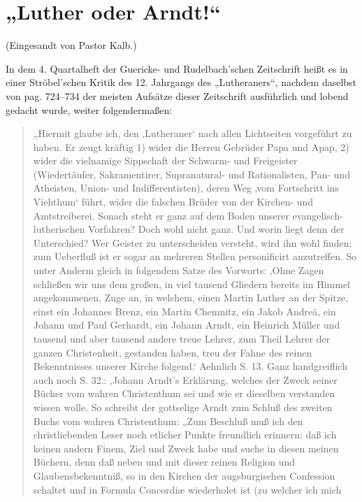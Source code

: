 \chapter{„Luther oder Arndt!“}

\begin{center}
(Eingesandt von Pastor Kalb.)
\end{center}

In dem 4. Quartalheft der Guericke- und Rudelbach’schen Zeitschrift heißt es in einer Ströbel’schen
Kritik des 12. Jahrgangs des „Lutheraners“, nachdem daselbst von pag. 724–734 der meisten Aufsätze
dieser Zeitschrift ausführlich und lobend gedacht wurde, weiter folgendermaßen:

\begin{quote}
„Hiermit glaube ich, den ‚Lutheraner‘ nach allen Lichtseiten vorgeführt zu haben. Er zeugt
kräftig 1) wider die Herren Gebrüder Papa und Apap, 2) wider die vielnamige Sippschaft der Schwarm- und
Freigeister (Wiedertäufer, Sakramentirer, Supranatural- und Rationalisten, Pan- und Atheisten, Union-
und Indifferentisten), deren Weg ‚vom Fortschritt ins Viehthum‘ führt, wider die falschen Brüder
von der Kirchen- und Amtstreiberei. Sonach steht er ganz auf dem Boden unserer evangelisch-lutherischen
Vorfahren? Doch wohl nicht ganz. Und worin liegt denn der Unterschied? Wer Geister zu unterscheiden versteht,
wird ihn wohl finden; zum Ueberfluß ist er sogar an mehreren Stellen personificirt anzutreffen. So
unter Anderm gleich in folgendem Satze des Vorworts: ‚Ohne Zagen schließen wir uns dem großen,
in viel tausend Gliedern bereits im Himmel angekommenen, Zuge an, in welchem, einen Martin Luther
an der Spitze, einst ein Johannes Brenz, ein Martin Chemnitz, ein Jakob Andreä, ein Johann und Paul
Gerhardt, ein Johann Arndt, ein Heinrich Müller und tausend und aber tausend andere treue Lehrer, zum
Theil Lehrer der ganzen Christenheit, gestanden haben, treu der Fahne des reinen Bekenntnisses unserer
Kirche folgend.‘ Aehnlich S. 13. Ganz handgreiflich auch noch S. 32.: ‚Johann Arndt’s Erklärung,
welches der Zweck seiner Bücher vom wahren Christenthum sei und wie er dieselben verstanden wissen
wolle. So schreibt der gottselige Arndt zum Schluß des zweiten Buchs vom wahren Christenthum: „Zum
Beschluß muß ich den christliebenden Leser noch etlicher Punkte freundlich erinnern: daß ich keinen
andern Finem, Ziel und Zweck habe und suche in diesen meinen Büchern, denn daß neben und mit dieser
reinen Religion und Glaubensbekenntniß, so in den Kirchen der augsburgischen
Confession schaltet und in Formula Concordiæ wiederholet ist (zu welcher ich mich

\end{quote}
